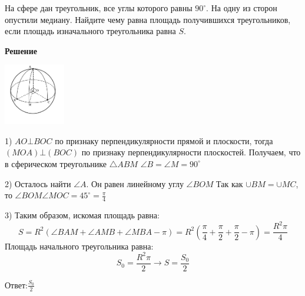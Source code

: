     На сфере дан треугольник, все углы которого равны $90^\circ$.
    На одну из сторон опустили медиану.
    Найдите чему равна площадь получившихся треугольников, если площадь изначального треугольника равна $S$.

     \textbf{Решение}\\

    \begin{center}
        \includegraphics[width=0.2\textwidth]{images/img9}\\
    \end{center}

    1) $AO\bot BOC$ по признаку перпендикулярности прямой и плоскости, тогда $(MOA)\bot(BOC)$ по признаку перпендикулярности
    плоскостей.
    Получаем, что в сферическом треугольнике $\triangle ABM$ $\angle B = \angle M = 90^\circ$

    2) Осталось найти $\angle A$.
    Он равен линейному углу $\angle BOM$
    Так как $\cup BM = \cup MC$, то $\angle BOM \angle MOC = 45^\circ = \frac{\pi}{4}$

    3) Таким образом, искомая площадь равна:
    \[
        S = R^2(\angle BAM + \angle AMB + \angle MBA - \pi) =
        R^2\left(\frac{\pi}{4} + \frac{\pi}{2}+ \frac{\pi}{2} - \pi\right) =
        \frac{R^2\pi}{4}
    \]
    Площадь начального треугольника равна:
    \[
        S_0 = \frac{R^2\pi}{2} \rightarrow S = \frac{S_0}{2}
    \]

    Ответ:$\frac{S_0}{2}$


